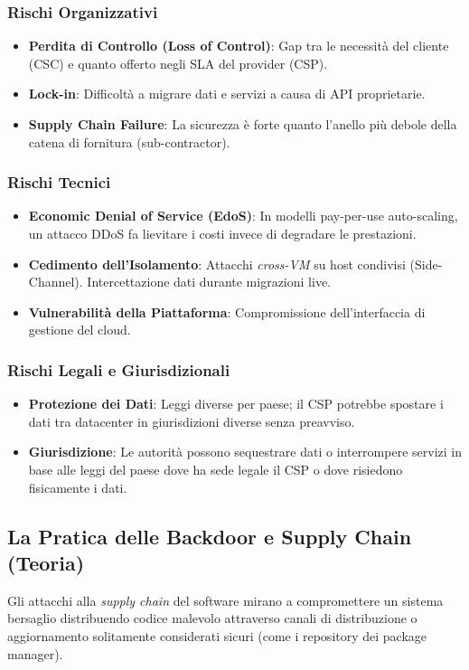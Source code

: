 \documentclass[12pt, a4paper]{report}
\begin{document}
\subsubsection{Rischi Organizzativi}
\begin{itemize}
	\item \textbf{Perdita di Controllo (Loss of Control)}: Gap tra le necessità del cliente (CSC) e quanto offerto negli SLA del provider (CSP).
	\item \textbf{Lock-in}: Difficoltà a migrare dati e servizi a causa di API proprietarie.
	\item \textbf{Supply Chain Failure}: La sicurezza è forte quanto l'anello più debole della catena di fornitura (sub-contractor).
\end{itemize}

\subsubsection{Rischi Tecnici}
\begin{itemize}
	\item \textbf{Economic Denial of Service (EdoS)}: In modelli pay-per-use auto-scaling, un attacco DDoS fa lievitare i costi invece di degradare le prestazioni.
	\item \textbf{Cedimento dell'Isolamento}: Attacchi \textit{cross-VM} su host condivisi (Side-Channel). Intercettazione dati durante migrazioni live.
	\item \textbf{Vulnerabilità della Piattaforma}: Compromissione dell'interfaccia di gestione del cloud.
\end{itemize}

\subsubsection{Rischi Legali e Giurisdizionali}
\begin{itemize}
	\item \textbf{Protezione dei Dati}: Leggi diverse per paese; il CSP potrebbe spostare i dati tra datacenter in giurisdizioni diverse senza preavviso.
	\item \textbf{Giurisdizione}: Le autorità possono sequestrare dati o interrompere servizi in base alle leggi del paese dove ha sede legale il CSP o dove risiedono fisicamente i dati.
\end{itemize}

\subsection{La Pratica delle Backdoor e Supply Chain (Teoria)}
Gli attacchi alla \textit{supply chain} del software mirano a compromettere un sistema bersaglio distribuendo codice malevolo attraverso canali di distribuzione o aggiornamento solitamente considerati sicuri (come i repository dei package manager).
\end{document}
